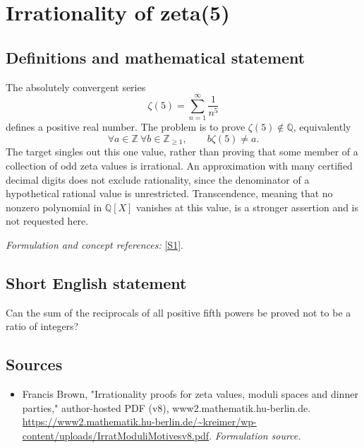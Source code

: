 \documentclass[11pt]{article}
\begin{document}
\section*{\texorpdfstring{Irrationality of zeta(5)}{Irrationality of zeta(5)}}\label{327}
\subsection{Definitions and mathematical statement}
The absolutely convergent series
\[
 \zeta(5)=\sum_{n=1}^{\infty}\frac1{n^5}
\]
defines a positive real number. The problem is to prove $\zeta(5)\notin{\mathbb{Q}}$, equivalently
\[
 \forall a\in{\mathbb{Z}}\ \forall b\in{\mathbb{Z}}_{\ge1},\qquad b\zeta(5)\ne a.
\]
The target singles out this one value, rather than proving that some member of a collection of odd zeta values is irrational. An approximation with many certified decimal digits does not exclude rationality, since the denominator of a hypothetical rational value is unrestricted. Transcendence, meaning that no nonzero polynomial in ${\mathbb{Q}}[X]$ vanishes at this value, is a stronger assertion and is not requested here.
\par\smallskip\textit{Formulation and concept references:} \href{https://www2.mathematik.hu-berlin.de/~kreimer/wp-content/uploads/IrratModuliMotivesv8.pdf}{[S1]}.

\subsection{Short English statement}
Can the sum of the reciprocals of all positive fifth powers be proved not to be a ratio of integers?
\subsection{Sources}
\begin{itemize}
\item[S1]Francis Brown, "Irrationality proofs for zeta values, moduli spaces and dinner parties," author-hosted PDF (v8), www2.mathematik.hu-berlin.de.
\url{https://www2.mathematik.hu-berlin.de/~kreimer/wp-content/uploads/IrratModuliMotivesv8.pdf}.
\textit{Formulation source.}
\end{itemize}
\end{document}
